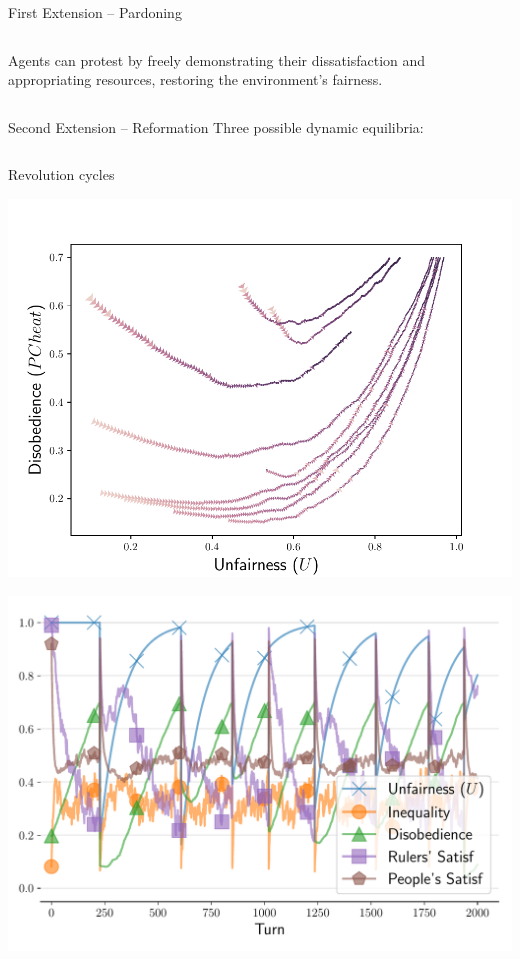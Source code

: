 \documentclass[xcolor={table}]{beamer}
\begin{document}
\begin{frame}[fragile=singleslide,t]
\begin{columns}[T]
\begin{column}{.58\textwidth}
\begin{block}{First Extension -- Pardoning}
\begin{columns}[c]
\begin{column}{.4\textwidth}
Agents can protest by freely demonstrating their dissatisfaction and appropriating resources, restoring the environment's fairness.
\end{column}
\end{columns}





\end{block} 


\begin{block}{Second Extension -- Reformation}
Three possible dynamic equilibria:



\begin{columns}[T]
\begin{column}{.333\textwidth}



\begin{center}
Revolution cycles

\includegraphics[width=\linewidth]{img/trajext2corrupted.pdf}\label{fig:ext2phase}

\includegraphics[width=.9\linewidth]{img/timecycle.pdf}\label{fig:revcycle}
\end{center}


\end{column}
\end{columns}
\end{block}
\end{column}
\end{columns}
\end{frame}
\end{document}
